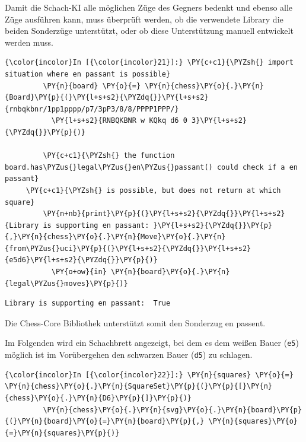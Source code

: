 Damit die Schach-KI alle möglichen Züge des Gegners bedenkt und ebenso
alle Züge ausführen kann, muss überprüft werden, ob die verwendete
Library die beiden Sonderzüge unterstützt, oder ob diese Unterstützung
manuell entwickelt werden muss.

    \begin{Verbatim}[commandchars=\\\{\}]
{\color{incolor}In [{\color{incolor}21}]:} \PY{c+c1}{\PYZsh{} import situation where en passant is possible}
         \PY{n}{board} \PY{o}{=} \PY{n}{chess}\PY{o}{.}\PY{n}{Board}\PY{p}{(}\PY{l+s+s2}{\PYZdq{}}\PY{l+s+s2}{rnbqkbnr/1pp1pppp/p7/3pP3/8/8/PPPP1PPP/}
		   \PY{l+s+s2}{RNBQKBNR w KQkq d6 0 3}\PY{l+s+s2}{\PYZdq{}}\PY{p}{)}
         
         \PY{c+c1}{\PYZsh{} the function board.has\PYZus{}legal\PYZus{}en\PYZus{}passant() could check if a en passant}
	 \PY{c+c1}{\PYZsh{} is possible, but does not return at which square}
         \PY{n+nb}{print}\PY{p}{(}\PY{l+s+s2}{\PYZdq{}}\PY{l+s+s2}{Library is supporting en passant: }\PY{l+s+s2}{\PYZdq{}}\PY{p}{,}\PY{n}{chess}\PY{o}{.}\PY{n}{Move}\PY{o}{.}\PY{n}{from\PYZus{}uci}\PY{p}{(}\PY{l+s+s2}{\PYZdq{}}\PY{l+s+s2}{e5d6}\PY{l+s+s2}{\PYZdq{}}\PY{p}{)} 
		   \PY{o+ow}{in} \PY{n}{board}\PY{o}{.}\PY{n}{legal\PYZus{}moves}\PY{p}{)}
\end{Verbatim}


    \begin{Verbatim}[commandchars=\\\{\}]
Library is supporting en passant:  True

    \end{Verbatim}

    Die Chess-Core Bibliothek unterstützt somit den Sonderzug en passent.

Im Folgenden wird ein Schachbrett angezeigt, bei dem es dem weißen Bauer
(\texttt{e5}) möglich ist im Vorübergehen den schwarzen Bauer
(\texttt{d5}) zu schlagen.

    \begin{Verbatim}[commandchars=\\\{\}]
{\color{incolor}In [{\color{incolor}22}]:} \PY{n}{squares} \PY{o}{=} \PY{n}{chess}\PY{o}{.}\PY{n}{SquareSet}\PY{p}{(}\PY{p}{[}\PY{n}{chess}\PY{o}{.}\PY{n}{D6}\PY{p}{]}\PY{p}{)}
         \PY{n}{chess}\PY{o}{.}\PY{n}{svg}\PY{o}{.}\PY{n}{board}\PY{p}{(}\PY{n}{board}\PY{o}{=}\PY{n}{board}\PY{p}{,} \PY{n}{squares}\PY{o}{=}\PY{n}{squares}\PY{p}{)} 
\end{Verbatim}

